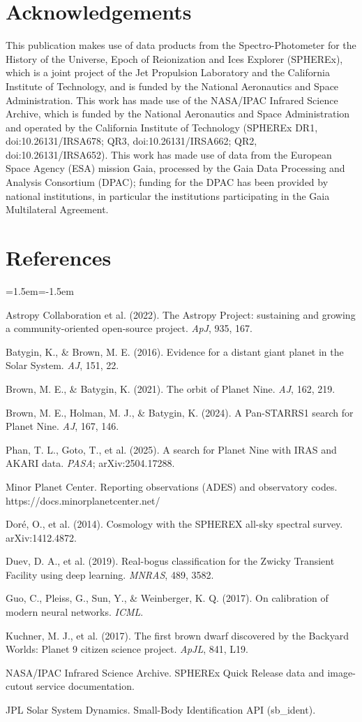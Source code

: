 \documentclass[twocolumn]{aastex631}
\begin{document}
\section*{Acknowledgements}
This publication makes use of data products from the Spectro-Photometer for the History of the Universe, Epoch of Reionization and Ices Explorer (SPHEREx), which is a joint project of the Jet Propulsion Laboratory and the California Institute of Technology, and is funded by the National Aeronautics and Space Administration. This work has made use of the NASA/IPAC Infrared Science Archive, which is funded by the National Aeronautics and Space Administration and operated by the California Institute of Technology (SPHEREx DR1, doi:10.26131/IRSA678; QR3, doi:10.26131/IRSA662; QR2, doi:10.26131/IRSA652). This work has made use of data from the European Space Agency (ESA) mission Gaia, processed by the Gaia Data Processing and Analysis Consortium (DPAC); funding for the DPAC has been provided by national institutions, in particular the institutions participating in the Gaia Multilateral Agreement.

\section*{References}
\begin{list}{}{\leftmargin=1.5em\itemindent=-1.5em\itemsep=2pt\small}
\item Astropy Collaboration et al. (2022). The Astropy Project: sustaining and growing a community-oriented open-source project. \emph{ApJ}, 935, 167.
\item Batygin, K., \& Brown, M. E. (2016). Evidence for a distant giant planet in the Solar System. \emph{AJ}, 151, 22.
\item Brown, M. E., \& Batygin, K. (2021). The orbit of Planet Nine. \emph{AJ}, 162, 219.
\item Brown, M. E., Holman, M. J., \& Batygin, K. (2024). A Pan-STARRS1 search for Planet Nine. \emph{AJ}, 167, 146.
\item Phan, T. L., Goto, T., et al. (2025). A search for Planet Nine with IRAS and AKARI data. \emph{PASA}; arXiv:2504.17288.
\item Minor Planet Center. Reporting observations (ADES) and observatory codes. https://docs.minorplanetcenter.net/
\item Doré, O., et al. (2014). Cosmology with the SPHEREX all-sky spectral survey. arXiv:1412.4872.
\item Duev, D. A., et al. (2019). Real-bogus classification for the Zwicky Transient Facility using deep learning. \emph{MNRAS}, 489, 3582.
\item Guo, C., Pleiss, G., Sun, Y., \& Weinberger, K. Q. (2017). On calibration of modern neural networks. \emph{ICML}.
\item Kuchner, M. J., et al. (2017). The first brown dwarf discovered by the Backyard Worlds: Planet 9 citizen science project. \emph{ApJL}, 841, L19.
\item NASA/IPAC Infrared Science Archive. SPHEREx Quick Release data and image-cutout service documentation.
\item JPL Solar System Dynamics. Small-Body Identification API (sb\_ident).
\end{list}
\end{document}
